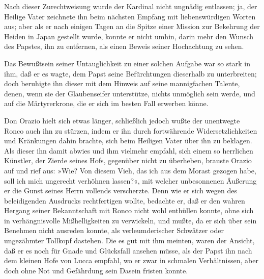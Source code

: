 Nach dieser Zurechtweisung wurde der Kardinal nicht ungnädig
entlassen; ja, der Heilige Vater zeichnete ihn beim nächsten
Empfang mit liebenswürdigen Worten aus; aber als er nach einigen
Tagen an die Spitze einer Mission zur Bekehrung der Heiden in Japan
gestellt wurde, konnte er nicht umhin, darin mehr den Wunsch des
Papstes, ihn zu entfernen, als einen Beweis seiner Hochachtung zu
sehen.

Das Bewußtsein seiner Untauglichkeit zu einer solchen Aufgabe war
so stark in ihm, daß er es wagte, dem Papst\pagenum{[90]} seine
Befürchtungen dieserhalb zu unterbreiten; doch beruhigte ihn dieser
mit dem Hinweis auf seine mannigfachen Talente, denen, wenn sie der
Glaubenseifer unterstütze, nichts unmöglich sein werde, und auf die
Märtyrerkrone, die er sich im besten Fall erwerben könne.

Don Orazio hielt sich etwas länger, schließlich jedoch wußte der
unentwegte Ronco auch ihn zu stürzen, indem er ihn durch
fortwährende Widersetzlichkeiten und Kränkungen dahin brachte, sich
beim Heiligen Vater über ihn zu beklagen. Als dieser ihn damit
abwies und ihm vielmehr empfahl, sich einem so herrlichen Künstler,
der Zierde seines Hofs, gegenüber nicht zu überheben, brauste
Orazio auf und rief aus: »Wie? Von diesem Vieh, das ich aus dem
Morast gezogen habe, soll ich mich ungerecht verhöhnen lassen?«,
mit welcher unbesonnenen Äußerung er die Gunst seines Herrn
vollends verscherzte. Denn wie er sich wegen des beleidigenden
Ausdrucks rechtfertigen wollte, bedachte er, daß er den wahren
Hergang seiner Bekanntschaft mit Ronco nicht wohl enthüllen konnte,
ohne sich in verhängnisvolle Mißhelligkeiten zu verwickeln, und
mußte, da er sich über sein Benehmen nicht ausreden konnte, als
verleumderischer Schwätzer oder ungezähmter Tollkopf dastehen. Die
es gut mit ihm meinten, waren der Ansicht, daß er es noch für Gnade
und Glücksfall ansehen müsse, als der Papst ihn nach dem kleinen
Hofe von Lucca empfahl, wo er zwar in schmalen Verhältnissen, aber
doch ohne Not und Gefährdung sein Dasein fristen konnte.

